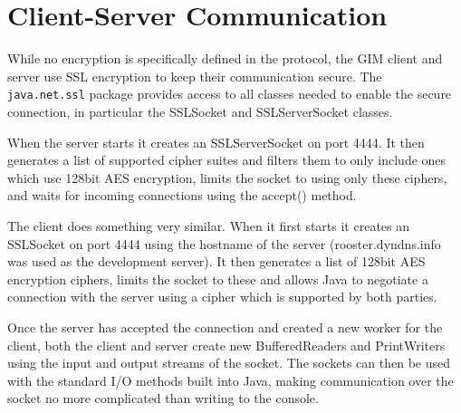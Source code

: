 \section{Client-Server Communication}
While no encryption is specifically defined in the protocol, the GIM client and server use SSL encryption to keep their communication secure. The \texttt{java.net.ssl} package provides access to all classes needed to enable the secure connection, in particular the SSLSocket and SSLServerSocket classes.

When the server starts it creates an SSLServerSocket on port 4444. It then generates a list of supported cipher suites and filters them to only include ones which use 128bit AES encryption, limits the socket to using only these ciphers, and waits for incoming connections using the accept() method.

The client does something very similar. When it first starts it creates an SSLSocket on port 4444 using the hostname of the server (rooster.dyndns.info was used as the development server). It then generates a list of 128bit AES encryption ciphers, limits the socket to these and allows Java to negotiate a connection with the server using a cipher which is supported by both parties.

Once the server has accepted the connection and created a new worker for the client, both the client and server create new BufferedReaders and PrintWriters using the input and output streams of the socket. The sockets can then be used with the standard I/O methods built into Java, making communication over the socket no more complicated than writing to the console.
